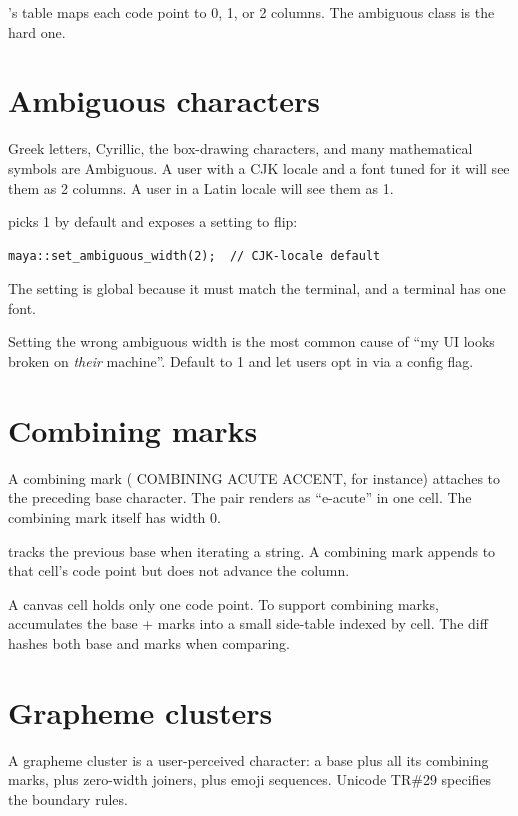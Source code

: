 \maya{}'s table maps each code point to 0, 1, or 2 columns. The
ambiguous class is the hard one.

\section{Ambiguous characters}

Greek letters, Cyrillic, the box-drawing characters, and many
mathematical symbols are Ambiguous. A user with a CJK locale and a
font tuned for it will see them as 2 columns. A user in a Latin
locale will see them as 1.

\maya{} picks 1 by default and exposes a setting to flip:

\begin{lstlisting}
maya::set_ambiguous_width(2);  // CJK-locale default
\end{lstlisting}

The setting is global because it must match the terminal, and a
terminal has one font.

\begin{warning}
Setting the wrong ambiguous width is the most common cause of
``my UI looks broken on \emph{their} machine''. Default to 1 and
let users opt in via a config flag.
\end{warning}

\section{Combining marks}

A combining mark ( COMBINING ACUTE ACCENT, for
instance) attaches to the preceding base character. The pair
 renders as ``e-acute'' in one cell. The combining
mark itself has width 0.

\maya{} tracks the previous base when iterating a string. A
combining mark appends to that cell's code point but does not
advance the column.

A canvas cell holds only one code point. To support combining
marks, \maya{} accumulates the base + marks into a small
side-table indexed by cell. The diff hashes both base and marks
when comparing.

\section{Grapheme clusters}

A grapheme cluster is a user-perceived character: a base plus
all its combining marks, plus zero-width joiners, plus emoji
sequences. Unicode TR\#29 specifies the boundary rules.

